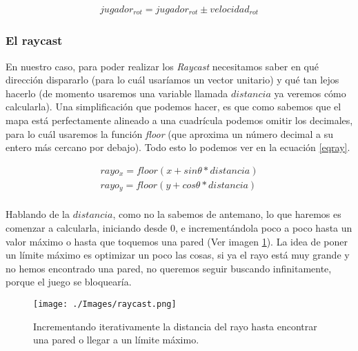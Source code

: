 \begin{equation}
\begin{aligned}
\label{movforw}
jugador_{rot} = jugador_{rot} \pm velocidad_{rot}
\end{aligned}
\end{equation}





\subsubsection{El raycast}

En nuestro caso, para poder realizar los \emph{Raycast} necesitamos saber en qué dirección dispararlo (para lo cuál usaríamos un vector unitario) y qué tan lejos hacerlo (de momento usaremos una variable llamada $distancia$ ya veremos cómo calcularla). Una simplificación que podemos hacer, es que como sabemos que el mapa está perfectamente alineado a una cuadrícula podemos omitir los decimales, para lo cuál usaremos la función \emph{floor} (que aproxima un número decimal a su entero más cercano por debajo). Todo esto lo podemos ver en la ecuación \ref{eqray}.

\begin{equation}
\begin{aligned}
\label{eqray}
rayo_x = floor(x + sin \theta * distancia)\\
rayo_y = floor(y + cos \theta * distancia)\\
\end{aligned}
\end{equation}

Hablando de la $distancia$, como no la sabemos de antemano, lo que haremos es comenzar a calcularla, iniciando desde 0, e incrementándola poco a poco hasta un valor máximo o hasta que toquemos una pared (Ver imagen \ref{raycastit}). La idea de poner un límite máximo es optimizar un poco las cosas, si ya el rayo está muy grande y no hemos encontrado una pared, no queremos seguir buscando infinitamente, porque el juego se bloquearía.

\begin{figure}[h!]
	\centering
	\texttt{[image: ./Images/raycast.png]}
	\caption{Incrementando iterativamente la distancia del rayo hasta encontrar una pared o llegar a un límite máximo.}
	\label{raycastit}
\end{figure}



